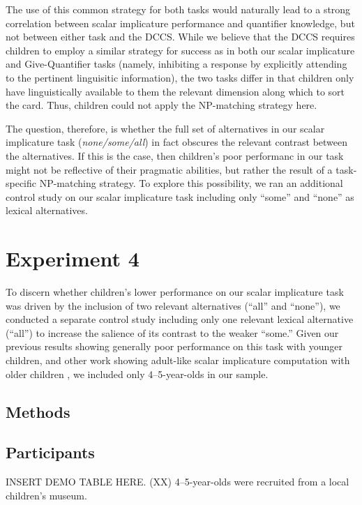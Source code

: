 \documentclass[man]{apa2}
\begin{document}
{The use of this common strategy for both tasks would naturally lead to a strong correlation between scalar implicature performance and quantifier knowledge, but not between either task and the DCCS. While we believe that the DCCS requires children to employ a similar strategy for success as in both our scalar implicature and Give-Quantifier tasks (namely, inhibiting a response by explicitly attending to the pertinent linguisitic information), the two tasks differ in that children only have linguistically available to them the relevant dimension along which to sort the card. Thus, children could not apply the NP-matching strategy here. 

The question, therefore, is whether the full set of alternatives in our scalar implicature task (\emph{none/some/all}) in fact obscures the relevant contrast between the alternatives. If this is the case, then children's poor performanc in our task might not be reflective of their pragmatic abilities, but rather the result of a task-specific NP-matching strategy. To explore this possibility, we ran an additional control study on our scalar implicature task including only ``some'' and ``none'' as lexical alternatives. 

\section{Experiment 4} 

To discern whether children's lower performance on our scalar implicature task was driven by the inclusion of two relevant alternatives (``all'' and ``none''), we conducted a separate control study including only one relevant lexical alternative (``all'') to increase the salience of its contrast to the weaker ``some.'' Given our previous results showing generally poor performance on this task with younger children, and other work showing adult-like scalar implicature computation with older children , we included only 4--5-year-olds in our sample. 

\subsection{Methods}

\subsection{Participants}
INSERT DEMO TABLE HERE. (XX) 4--5-year-olds were recruited from a local children's museum. 

}
\end{document}
